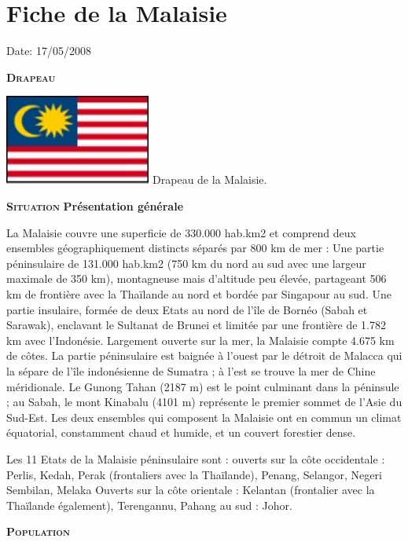\section{Fiche de la Malaisie}

Date: 17/05/2008

\begin{multicols}{2}

\textbf{\textsc{Drapeau}}

\hspace*{-0.65cm}
\includegraphics[width=4.8cm]{articles/Fiche-de-la-malaisie/1210328778gbyq.jpg}
Drapeau de la Malaisie.


\textbf{\textsc{Situation}}
\textbf{Présentation générale}

La Malaisie couvre une superficie de 330.000 hab.km2 et comprend deux ensembles géographiquement distincts séparés par 800 km de mer :  Une partie péninsulaire de 131.000 hab.km2 (750 km du nord au sud avec une largeur maximale de 350 km), montagneuse mais d'altitude peu élevée, partageant 506 km de frontière avec la Thaïlande au nord et bordée par Singapour au sud.
Une partie insulaire, formée de deux Etats au nord de l'île de Bornéo (Sabah et Sarawak), enclavant le Sultanat de Brunei et limitée par une frontière de 1.782 km avec l'Indonésie. Largement ouverte sur la mer, la Malaisie compte 4.675 km de côtes. La partie péninsulaire est baignée à l'ouest par le détroit de Malacca qui la sépare de l'île indonésienne de Sumatra ; à l'est se trouve la mer de Chine méridionale. Le Gunong Tahan (2187 m) est le point culminant dans la péninsule ; au Sabah, le mont Kinabalu (4101 m) représente le premier sommet de l'Asie du Sud-Est. Les deux ensembles qui composent la Malaisie ont en commun un climat équatorial, constamment chaud et humide, et un couvert forestier dense.

Les 11 Etats de la Malaisie péninsulaire sont :  ouverts sur la côte occidentale : Perlis, Kedah, Perak (frontaliers avec la Thaïlande), Penang, Selangor, Negeri Sembilan, Melaka Ouverts sur la côte orientale : Kelantan (frontalier avec la Thaïlande également), Terengannu, Pahang au sud : Johor.

\textbf{\textsc{Population}}


\end{multicols}
